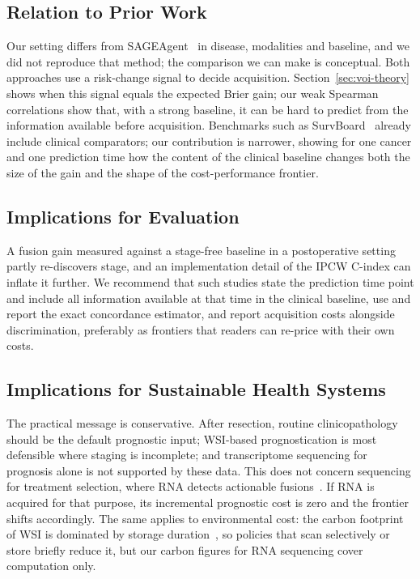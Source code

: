 \documentclass[journal,twoside,web]{IEEEtran}
\begin{document}
\subsection{Relation to Prior Work}
Our setting differs from SAGEAgent~\cite{qu2026} in disease, modalities and baseline, and we did not reproduce that method; the comparison we can make is conceptual. Both approaches use a risk-change signal to decide acquisition. Section~\ref{sec:voi-theory} shows when this signal equals the expected Brier gain; our weak Spearman correlations show that, with a strong baseline, it can be hard to predict from the information available before acquisition. Benchmarks such as SurvBoard~\cite{wissel2025} already include clinical comparators; our contribution is narrower, showing for one cancer and one prediction time how the content of the clinical baseline changes both the size of the gain and the shape of the cost-performance frontier.

\subsection{Implications for Evaluation}
A fusion gain measured against a stage-free baseline in a postoperative setting partly re-discovers stage, and an implementation detail of the IPCW C-index can inflate it further. We recommend that such studies state the prediction time point and include all information available at that time in the clinical baseline, use and report the exact concordance estimator, and report acquisition costs alongside discrimination, preferably as frontiers that readers can re-price with their own costs.

\subsection{Implications for Sustainable Health Systems}
The practical message is conservative. After resection, routine clinicopathology should be the default prognostic input; WSI-based prognostication is most defensible where staging is incomplete; and transcriptome sequencing for prognosis alone is not supported by these data. This does not concern sequencing for treatment selection, where RNA detects actionable fusions~\cite{ortendahl2025}. If RNA is acquired for that purpose, its incremental prognostic cost is zero and the frontier shifts accordingly. The same applies to environmental cost: the carbon footprint of WSI is dominated by storage duration~\cite{tilmant2026}, so policies that scan selectively or store briefly reduce it, but our carbon figures for RNA sequencing cover computation only.
\end{document}
